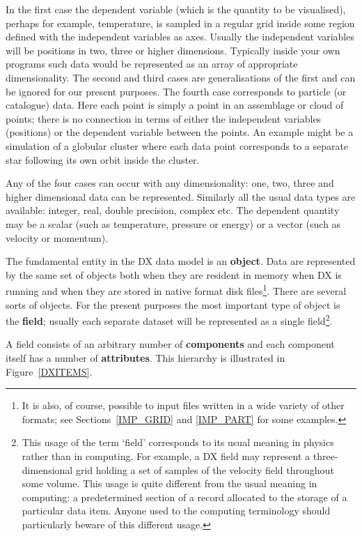 \documentclass[twoside,11pt]{article}
\begin{document}
In the first case the dependent variable (which is the quantity to be
visualised), perhaps for example, temperature, is sampled in a regular
grid inside some region defined with the independent variables as axes.
Usually the independent variables will be positions in two, three or
higher dimensions. Typically inside your own programs such data would be
represented as an array of appropriate dimensionality. The second and third
cases are generalisations of the first and can be ignored for our present
purposes. The fourth case corresponds to particle (or catalogue) data.
Here each point is simply a point in an assemblage or cloud of points;
there is no connection in terms of either the independent variables
(positions) or the dependent variable between the points. An example
might be a simulation of a globular cluster where each data point
corresponds to a separate star following its own orbit inside the
cluster.

Any of the four cases can occur with any dimensionality: one, two,
three and higher dimensional data can be represented. Similarly all
the usual data types are available: integer, real, double precision,
complex etc. The dependent quantity may be a scalar (such as temperature,
pressure or energy) or a vector (such as velocity or momentum).

The fundamental entity in the DX data model is an {\bf object}. Data
are represented by the same set of objects both when they are resident
in memory when DX is running and when they are stored in native format
disk files\footnote{It is also, of course, possible to input files
written in a wide variety of other formats; see Sections~\ref{IMP_GRID}
and \ref{IMP_PART} for some examples.}. There are several sorts of objects.
For the present purposes the most important type of object is the {\bf
field}; usually each separate dataset will be represented as a single
field\footnote{This usage of the term `field' corresponds to its usual
meaning in physics rather than in computing. For example, a DX field may
represent a three-dimensional grid holding a set of samples of the
velocity field throughout some volume. This usage is quite different from
the usual meaning in computing: a predetermined section of a record
allocated to the storage of a particular data item. Anyone used to the
computing terminology should particularly beware of this different
usage.}.

A field consists of an arbitrary number of {\bf components} and each
component itself has a number of {\bf attributes}. This hierarchy is
illustrated in Figure~\ref{DXITEMS}.
\end{document}
